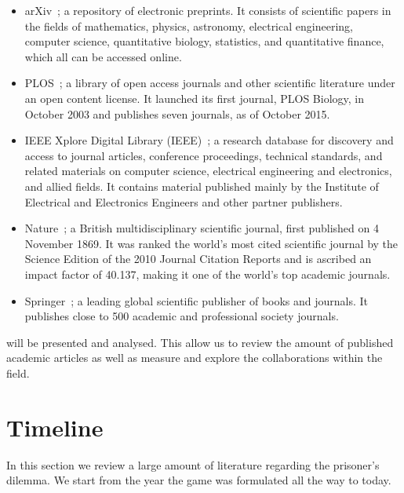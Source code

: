 \documentclass{article}
\theoremstyle{definition}
\begin{document}
\begin{multicols}{2}
    \begin{itemize}
        \item arXiv~\cite{mckiernan2000}; a repository of electronic preprints.
        It consists of scientific
        papers in the fields of mathematics, physics, astronomy, electrical engineering,
        computer science, quantitative biology, statistics, and quantitative finance,
        which all can be accessed online.
        \item PLOS~\cite{plos}; a library of open access journals and other scientific literature
        under an open content license. It launched its first journal, PLOS Biology,
        in October 2003 and publishes seven journals, as of October 2015.
        \item IEEE Xplore Digital Library (IEEE)~\cite{ieee}; a research database for discovery
        and access to journal articles, conference proceedings, technical standards,
        and related materials on computer science, electrical engineering and electronics,
        and allied fields. It contains material published mainly by the Institute of
        Electrical and Electronics Engineers and other partner publishers. 
        \item Nature~\cite{nature}; a British multidisciplinary scientific journal,
        first published on 4 November 1869. It was ranked the world's most cited
        scientific journal by the Science Edition of the 2010 Journal Citation Reports
        and is ascribed an impact factor of 40.137, making it one of the world's
        top academic journals.
        \item Springer~\cite{springer}; a leading global scientific publisher of
        books and journals. It publishes close to 500 academic and professional
        society journals.
    \end{itemize}
\end{multicols}

will be presented and analysed. This allow us to review the amount of published
academic articles as well as measure and explore the collaborations within the field.

\section{Timeline}\label{section:timeline}

In this section we review a large amount of literature regarding the prisoner's
dilemma. We start from the year the game was formulated all the way to today.
\end{document}
